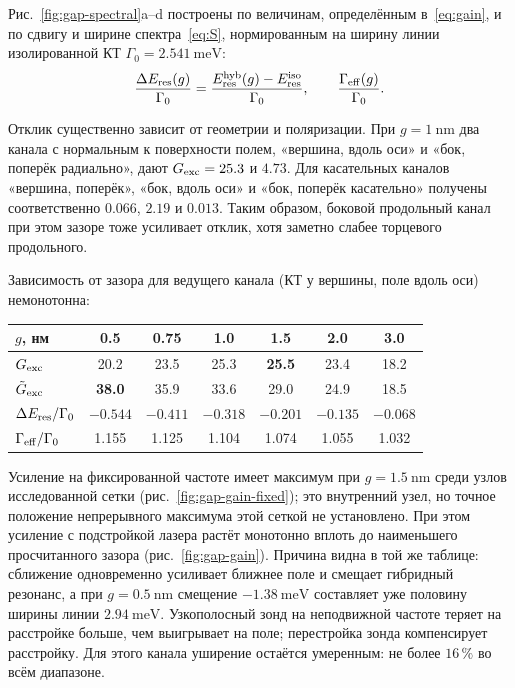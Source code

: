 Рис.~\ref{fig:gap-spectral}a--d построены по величинам, определённым
в~\eqref{eq:gain}, и по сдвигу и ширине спектра~\eqref{eq:S}, нормированным на
ширину линии изолированной КТ $\Gamma_0=\SI{2.541}{\milli\electronvolt}$:
\begin{equation}
  \frac{\Delta E_{\rm res}(g)}{\Gamma_0}
  = \frac{E_{\rm res}^{\rm hyb}(g) - E_{\rm res}^{\rm iso}}{\Gamma_0},
  \qquad
  \frac{\Gamma_{\rm eff}(g)}{\Gamma_0}.
  \label{eq:shift-width}
\end{equation}

Отклик существенно зависит от геометрии и поляризации.
При $g=\SI{1}{\nano\meter}$ два канала с нормальным к поверхности полем,
«вершина, вдоль оси» и «бок, поперёк радиально», дают
$G_{\rm exc}=25.3$ и $4.73$. Для касательных каналов
«вершина, поперёк», «бок, вдоль оси» и «бок, поперёк касательно»
получены соответственно $0.066$, $2.19$ и $0.013$.
Таким образом, боковой продольный канал при этом зазоре тоже усиливает
отклик, хотя заметно слабее торцевого продольного.

Зависимость от зазора для ведущего канала (КТ у вершины, поле вдоль оси)
немонотонна:
\begin{center}\small
\begin{tabular}{lcccccc}
  \toprule
  $g$, нм & 0.5 & 0.75 & 1.0 & 1.5 & 2.0 & 3.0 \\
  \midrule
  $G_{\rm exc}$ & 20.2 & 23.5 & 25.3 & \textbf{25.5} & 23.4 & 18.2 \\
  $\tilde G_{\rm exc}$ & \textbf{38.0} & 35.9 & 33.6 & 29.0 & 24.9 & 18.5 \\
  $\Delta E_{\rm res}/\Gamma_0$ & $-0.544$ & $-0.411$ & $-0.318$ & $-0.201$ & $-0.135$ & $-0.068$ \\
  $\Gamma_{\rm eff}/\Gamma_0$ & 1.155 & 1.125 & 1.104 & 1.074 & 1.055 & 1.032 \\
  \bottomrule
\end{tabular}
\end{center}

Усиление на фиксированной частоте имеет максимум при
$g=\SI{1.5}{\nano\meter}$ среди узлов исследованной сетки
(рис.~\ref{fig:gap-gain-fixed}); это внутренний узел, но точное положение
непрерывного максимума этой сеткой не установлено. При этом
усиление с подстройкой лазера растёт монотонно вплоть до наименьшего
просчитанного зазора (рис.~\ref{fig:gap-gain}). Причина видна в той же
таблице: сближение одновременно усиливает ближнее поле и смещает гибридный
резонанс, а при $g=\SI{0.5}{\nano\meter}$ смещение $-\SI{1.38}{\milli\electronvolt}$
составляет уже половину ширины линии $\SI{2.94}{\milli\electronvolt}$. Узкополосный
зонд на неподвижной частоте теряет на расстройке больше, чем выигрывает на поле;
перестройка зонда компенсирует расстройку. Для этого канала уширение
остаётся умеренным: не более
$16\,\%$ во всём диапазоне.


